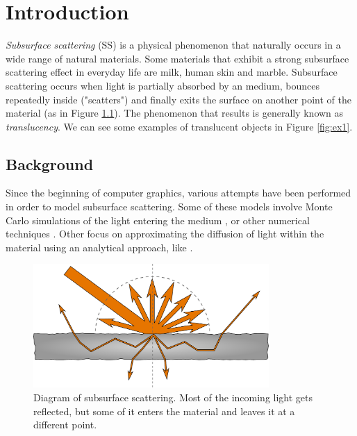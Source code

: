 \chapter{Introduction}
\label{chap:intro}
\emph{Subsurface scattering} (SS) is a physical phenomenon that naturally occurs in a wide range of natural materials. Some materials that exhibit a strong subsurface scattering effect in everyday life are milk, human skin and marble. Subsurface scattering occurs when light is partially absorbed by an medium, bounces repeatedly inside ("scatters") and finally exits the surface on another point of the material (as in Figure \ref{fig:ssdiagram}). The phenomenon that results is generally known as \emph{translucency}. We can see some examples of translucent objects in Figure \ref{fig:ex1}.

\section{Background}
Since the beginning of computer graphics, various attempts have been performed in order to model subsurface scattering. Some of these models involve Monte Carlo simulations of the light entering the medium \citep{Pharr:2000:MCE:344779.344824}, or other numerical techniques \cite{Fattal:2009:PMI:1477926.1477933,Kaplanyan:2010:CLP:1730804.1730821}. Other focus on approximating the diffusion of light within the material using an analytical approach, like \citep{Jensen:2001:PMS:383259.383319}.
 
\clearpage
\begin{figure}[!ht]
\centering
\includegraphics[width=0.8\textwidth]{images/diagram.pdf}
\caption{Diagram of subsurface scattering. Most of the incoming light gets reflected, but some of it enters the material and leaves it at a different point.}
\label{fig:ssdiagram}
\end{figure}

